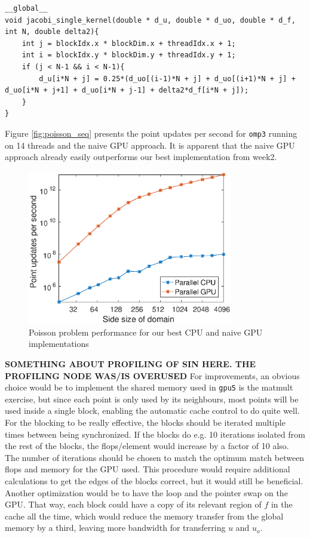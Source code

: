 \begin{lstlisting}
__global__ 
void jacobi_single_kernel(double * d_u, double * d_uo, double * d_f, int N, double delta2){
	int j = blockIdx.x * blockDim.x + threadIdx.x + 1;
	int i = blockIdx.y * blockDim.y + threadIdx.y + 1;
	if (j < N-1 && i < N-1){
		d_u[i*N + j] = 0.25*(d_uo[(i-1)*N + j] + d_uo[(i+1)*N + j] + d_uo[i*N + j+1] + d_uo[i*N + j-1] + delta2*d_f[i*N + j]);
	}
}
\end{lstlisting}

Figure \ref{fig:poisson_seq} presents the point updates per second for \texttt{omp3} running on 14 threads and the naive GPU approach. It is apparent that the naive GPU approach already easily outperforms our best implementation from week2.  


\begin{figure}
\centering
\includegraphics[width = 0.8\textwidth]{fig/gpupar.eps}
\caption{Poisson problem performance for our best CPU and naive GPU implementations}
\label{fig:poisson_sin}
\end{figure}

\textbf{SOMETHING ABOUT PROFILING OF SIN HERE. THE PROFILING NODE WAS/IS OVERUSED}
For improvements, an obvious choice would be to implement the shared memory used in \texttt{gpu5} is the matmult exercise, but since each point is only used by its neighbours, most points will be used inside a single block, enabling the automatic cache control to do quite well. For the blocking to be really effective, the blocks should be iterated multiple times between being synchronized. If the blocks do e.g. 10 iterations isolated from the rest of the blocks, the flops/element would increase by a factor of 10 also. The number of iterations should be chosen to match the optimum match between flops and memory for the GPU used. This procedure would require additional calculations to get the edges of the blocks correct, but it would still be beneficial. Another optimization would be to have the loop and the pointer swap on the GPU. That way, each block could have a copy of its relevant region of $f$ in the cache all the time, which would reduce the memory transfer from the global memory by a third, leaving more bandwidth for transferring $u$ and $u_o$.


